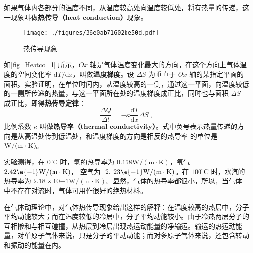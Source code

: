 
如果气体内各部分的温度不同，从温度较高处向温度较低处，将有热量的传递，这一现象叫做\textbf{热传导（heat conduction）}现象。

\begin{figure}[ht]
\centering
\texttt{[image: ./figures/36e0ab71602be50d.pdf]}
\caption{热传导现象} \label{fig_Heatco_1}
\end{figure}

如\autoref{fig_Heatco_1} 所示，$Ox$ 轴是气体温度变化最大的方向，在这个方向上气体温度的空间变化率 $\mathrm dT/\mathrm dx$，叫做\textbf{温度梯度}。设 $\Delta S$ 为垂直于 $Ox $ 轴的某指定平面的面积。实验证明，在单位时间内，从温度较高的一侧，通过这一平面，向温度较低的一侧所传递的热量，与这一平面所在处的温度梯度成正比，同时也与面积 $\Delta S$ 成正比，即得\textbf{热传导定律}：
\begin{equation}
\frac{\Delta Q}{\Delta t}=-\kappa \frac{\mathrm{d} T}{\mathrm{d} x} \Delta S~,
\end{equation}
比例系数 $\kappa$ 叫做\textbf{热导率（thermal conductivity）}。式中负号表示热量传递的方向是从高温处传到低温处，和温度梯度的方向是相反的热导率
的单位是 $\rm W /(m \cdot K)$。

实验测得，在 $0^{\circ} \mathrm{C}$ 时，氢的热导率为 $0.168 \mathrm{W} /(\mathrm{m} \cdot \mathrm{K})$，氧气 $2.42\e{-1} \mathrm{W} /(\mathrm{m} \cdot \mathrm{K})$， 空气为 $\text { 2. } 23\e{-1} \mathrm{W} /(\mathrm{m} \cdot \mathrm{K})$。在 $100^{\circ} \mathrm{C}$ 时，水汽的热导率为 $2. 18\times  10{-1}\mathrm{W} /(\mathrm{m} \cdot \mathrm{K})$。显然，气体的热导率都很小，所以，当气体中不存在对流时，气体可用作很好的绝热材料。

在气体动理论中，对气体热传导现象给出这样的解释：在温度较高的热层中，分子平均动能较大；而在温度较低的冷层中，分子平均动能较小。由于冷热两层分子的互相掺和与相互碰撞，从热层到冷层出现热运动能量的净输运。输运的热运动能量，对单原子气体来说，只是分子的平动动能；而对多原子气体来说，还包含转动和振动的能量在内。
